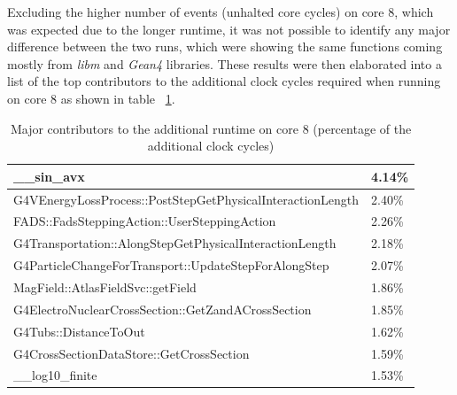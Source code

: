 \documentclass[a4paper]{jpconf}
\begin{document}
Excluding the higher number of events
(unhalted core cycles) on core 8, which was expected due to the longer runtime,
it was not possible to identify any major difference between the two runs, which
were showing the same functions coming mostly from \textit{libm} and \textit{Gean4} 
libraries. These results were then elaborated into a list of the top contributors 
to the additional clock cycles required when running on core 8 as shown 
in table ~\ref{major-contributors}.

\begin{table}
\begin{center}
\begin{tabular}{ | l | l |}
    \hline
	\_\_sin\_avx & 4.14\% \\
	\hline
	G4VEnergyLossProcess::PostStepGetPhysicalInteractionLength & 2.40\% \\
    \hline
 	FADS::FadsSteppingAction::UserSteppingAction & 2.26\% \\
    \hline
	G4Transportation::AlongStepGetPhysicalInteractionLength & 2.18\% \\
    \hline
	G4ParticleChangeForTransport::UpdateStepForAlongStep & 2.07\% \\
    \hline
	MagField::AtlasFieldSvc::getField & 1.86\% \\
    \hline
	G4ElectroNuclearCrossSection::GetZandACrossSection	& 1.85\% \\
	\hline
	G4Tubs::DistanceToOut & 1.62\% \\
	\hline
	G4CrossSectionDataStore::GetCrossSection & 1.59\% \\
	\hline
	\_\_log10\_finite &	1.53\% \\
	\hline
\end{tabular}
\end{center}
\caption{Major contributors to the additional runtime on core 8 (percentage
of the additional clock cycles) }
\label{major-contributors}
\end{table}
\end{document}
